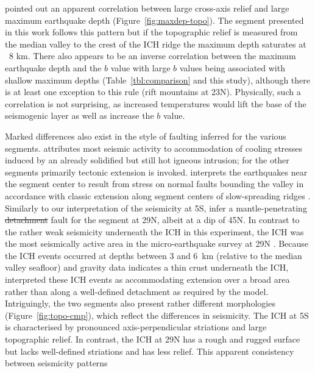 \documentclass[jgr]{agu2001}
\newlength{\tw}
\providecommand{\DIFadd}[1]{{\protect\color{blue}\uwave{#1}}} %
\providecommand{\DIFdel}[1]{{\protect\color{red}\sout{#1}}}                      %
\providecommand{\DIFaddbegin}{} %
\providecommand{\DIFaddend}{} %
\providecommand{\DIFdelbegin}{} %
\providecommand{\DIFdelend}{} %
\begin{document}
\begin{article}
\citet{barclay01} pointed out an apparent correlation between
large cross-axis relief and large maximum earthquake depth
(Figure~\ref{fig:maxdep-topo}).  The segment presented in this work
follows this pattern but if the topographic relief is measured
from the median valley to the crest of the ICH ridge the maximum depth saturates at ~8 km.
There also appears to be an inverse correlation
between the maximum earthquake depth and the $b$ value with
large $b$ values being associated with shallow maximum depths
(Table~\ref{tbl:comparison} and this study),
although there is at least one exception to this rule (rift mountains
at 23\dg N).  Physically, such a correlation is not surprising, as
increased temperatures would lift the base of the seismogenic
layer as well as increase the $b$ value.  

Marked differences also
exist in  the style of faulting inferred for the various segments.
\citet{kong92} attributes most seismic activity to accommodation of
cooling stresses induced by an already solidified but still hot
igneous intrusion; for the other segments primarily tectonic extension
is invoked.  \citet{barclay01} interprets the earthquakes 
 near the
segment center to result from  stress on normal faults bounding the
valley in accordance with classic extension along segment centers of
slow-spreading ridges \citep{mutter92}.   Similarly to our
interpretation of the seismicity at 5\dg S, \citet{toomey88} infer a
\DIFaddbegin \DIFadd{large }\DIFaddend mantle-penetrating 
\DIFdelbegin \DIFdel{detachment }\DIFdelend %
\DIFaddbegin \DIFadd{normal }\DIFaddend fault for the segment at 29\dg N, albeit
at a dip of 45\dg N.  In contrast to the rather weak seismicity
underneath the ICH in this experiment, the ICH was the most
seismically active area in the micro-earthquake survey at 29\dg N
\citep{wolfe95}. Because the ICH events occurred at depths between 3
and 6~km (relative to the median valley seafloor) and gravity data
indicates a thin crust underneath the ICH, \citet{wolfe95} interpreted
these ICH events as accommodating extension over a broad area rather
than along a well-defined detachment as required by the
\citet{tucholke94} model.   Intriguingly, the two segments also
present rather different morphologies (Figure~\ref{fig:topo-cmp}),
which reflect the differences in seismicity.  The ICH at
5\dg S is characterised by pronounced axis-perpendicular striations
and large topographic relief.  In contrast, the ICH at 29\dg N has a
rough and rugged surface but lacks well-defined striations and has
less relief.  This apparent consistency between seismicity patterns

\end{article}
\end{document}
